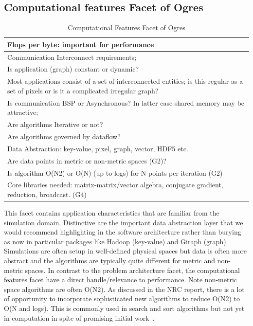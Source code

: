 \documentclass{acm_proc_article-sp}
\begin{document}
\subsection{Computational features Facet of Ogres}
\begin{table}[H]
\centering
\caption{ Computational Features Facet of Ogres}
\label{Table7}
\begin{tabular}{|p{8cm}|} \hline
Flops per byte: important for performance \\ \hline
Communication Interconnect requirements; \\ \hline
Is application (graph) constant or dynamic? \\ \hline
Most applications consist of a set of interconnected entities; is this regular as a set of pixels or is it a complicated irregular graph? \\ \hline
Is communication BSP or Asynchronous? In latter case shared memory may be attractive;\\ \hline
Are algorithms Iterative or not?\\ \hline
Are algorithms governed by dataflow?\\ \hline
Data Abstraction: key-value, pixel, graph, vector, HDF5 etc.\\ \hline
Are data points in metric or non-metric spaces (G2)? \\ \hline
Is algorithm O(N2) or O(N) (up to logs) for N points per iteration (G2)\\ \hline
Core libraries needed: matrix-matrix/vector algebra, conjugate gradient, reduction, broadcast. (G4)
\\ \hline
\end{tabular}
\end{table}


This facet contains application characteristics that are familiar from the
simulation domain. Distinctive are the important data abstraction layer that we
would recommend highlighting in the software architecture rather than burying
as now in particular packages like Hadoop (key-value) and Giraph (graph).
Simulations are often setup in well-defined physical spaces but data is often
more abstract and the algorithms are typically quite different for metric and
non-metric spaces. In contrast to the problem architecture facet, the
computational features facet have a direct handle/relevance to performance.
Note non-metric space algorithms are often O(N2). As discussed in the NRC
report, there is a lot of opportunity to incorporate sophisticated new
algorithms to reduce O(N2) to O(N and logs). This is commonly used in search
and sort algorithms but not yet in computation in spite of promising initial
work~\cite{b13,b23,b19}.
\end{document}
